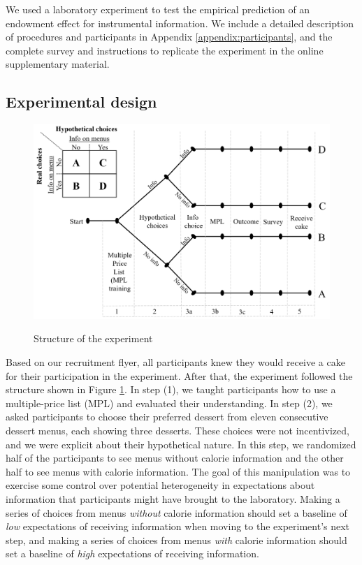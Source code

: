 
We used a laboratory experiment to test the empirical prediction of an endowment effect for instrumental information. We include a detailed description of procedures and participants in Appendix \ref{appendix:participants}, and the complete survey and instructions to replicate the experiment in the online supplementary material.

\subsection{Experimental design}

\begin{figure}[ht]
  \caption{Structure of the experiment}\label{fig:expDesign}
  \begin{center}
  {\includegraphics[width=1\textwidth]{./figures/experimentalDesign.png}}
  \end{center}
\end{figure}

Based on our recruitment flyer, all participants knew they would receive a cake for their participation in the experiment. After that, the experiment followed the structure shown in Figure \ref{fig:expDesign}. In step (1), we taught participants how to use a multiple-price list (MPL) and evaluated their understanding. In step (2), we asked participants to choose their preferred dessert from eleven consecutive dessert menus, each showing three desserts. These choices were not incentivized, and we were explicit about their hypothetical nature. In this step, we randomized half of the participants to see menus without calorie information and the other half to see menus with calorie information. The goal of this manipulation was to exercise some control over potential heterogeneity in expectations about information that participants might have brought to the laboratory. Making a series of choices from menus \emph{without} calorie information should set a baseline of \emph{low} expectations of receiving information when moving to the experiment’s next step, and making a series of choices from menus \emph{with} calorie information should set a baseline of \emph{high} expectations of receiving information.

